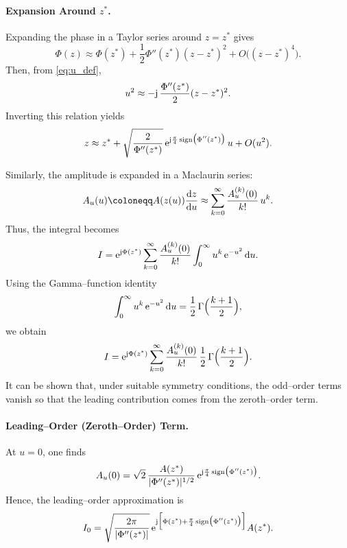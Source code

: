 \documentclass[11pt]{article}
\begin{document}
\paragraph{Expansion Around \(z^*\).}  
Expanding the phase in a Taylor series around \(z=z^*\) gives
\begin{equation}
    \Phi(z) \approx \Phi(z^*) + \frac{1}{2}\Phi''(z^*)(z-z^*)^2 + O\big((z-z^*)^4\big).
\end{equation}
Then, from \eqref{eq:u_def},
\begin{equation}
    u^2 \approx -\mathrm{j}\,\frac{\Phi''(z^*)}{2}(z-z^*)^2.
\end{equation}
Inverting this relation yields
\begin{equation}
    z \approx z^* + \sqrt{\frac{2}{\Phi''(z^*)}}\,
    \mathrm{e}^{\mathrm{j}\frac{\pi}{4}\,\text{sign}\big(\Phi''(z^*)\big)}\,u + O(u^2).
\end{equation}

Similarly, the amplitude is expanded in a Maclaurin series:
\begin{equation}
    A_u(u) \coloneqq A(z(u))\frac{\td z}{\td u} \approx \sum_{k=0}^{\infty}\frac{A_u^{(k)}(0)}{k!}\,u^k.
\end{equation}
Thus, the integral becomes
\begin{equation}
    I = \mathrm{e}^{\mathrm{j}\Phi(z^*)}\sum_{k=0}^{\infty}\frac{A_u^{(k)}(0)}{k!}\int_{0}^{\infty} u^k\,\mathrm{e}^{-u^2}\,\mathrm{d} u.
\end{equation}
Using the Gamma–function identity
\begin{equation}
    \int_{0}^{\infty}u^k\,\mathrm{e}^{-u^2}\,\mathrm{d} u=\frac{1}{2}\,\Gamma\Bigl(\frac{k+1}{2}\Bigr),
\end{equation}
we obtain
\begin{equation}
    I = \mathrm{e}^{\mathrm{j}\Phi(z^*)}\sum_{k=0}^{\infty}\frac{A_u^{(k)}(0)}{k!}\,\frac{1}{2}\,\Gamma\Bigl(\frac{k+1}{2}\Bigr).
\end{equation}
It can be shown that, under suitable symmetry conditions, the odd–order terms vanish so that the leading contribution comes from the zeroth–order term.

\paragraph{Leading–Order (Zeroth–Order) Term.}  
At \(u=0\), one finds
\begin{equation}
    A_u(0)=\sqrt{2}\,\frac{A(z^*)}{|\Phi''(z^*)|^{1/2}}\,
    \mathrm{e}^{\mathrm{j}\frac{\pi}{4}\,\text{sign}\big(\Phi''(z^*)\big)}.
\end{equation}
Hence, the leading–order approximation is
\begin{equation}
    I_0 = \sqrt{\frac{2\pi}{|\Phi''(z^*)|}}\,
    \mathrm{e}^{\mathrm{j}\Bigl[\Phi(z^*)+\frac{\pi}{4}\,\text{sign}\big(\Phi''(z^*)\big)\Bigr]}A(z^*).
\end{equation}
\end{document}
